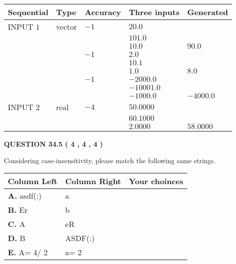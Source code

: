 \documentclass[12pt]{article}
\begin{document}
   
  
  
\noindent\begin{tabular}{|l|l|l|l|l|}
\hline
 Sequential & Type & Accuracy & Three inputs & Generated \\ 
\hline
 
 
  INPUT $            1 $ & vector & $           -1  $ & $
20.0
  $ & \\
  & & & $
101.0
  $ & \\
  & & & $
10.0
$ & $ 90.0 $ 
  \\
  & & $           -1  $ & $
2.0
  $ & \\
  & & & $
10.1
  $ & \\
  & & & $
1.0
$ & $ 8.0 $ 
  \\
  & & $           -1  $ & $
-2000.0
  $ & \\
  & & & $
-10001.0
  $ & \\
  & & & $
-1000.0
$ & $ -4000.0 $ 
 \\  \hline  
 
 
  INPUT $            2 $ & real & $           -4  $ & $
 50.0000
  $ & \\
  & & &  $
 60.1000
  $ & \\
  & & &  $
 2.0000
 $ & $ 58.0000 $ 
 \\  \hline  
 \end{tabular}
   
   
  
\vspace{0.2in}
  
{\textbf{\Large{QUESTION
34.5 
 (           4 ,           4 ,           4 )
}}}
  
  
Considering case-insensitivity, please match the following same strings.
  
  
\begin{tabular}{|l|l|l|}
 \hline
 Column Left & Column Right  & Your choinces \\ 
 \hline
{\textbf{\large{
A.}}}
asdf(:)
  & 
a
 & 
 \\ 
 \hline
{\textbf{\large{
B.}}}
Er
  & 
b
 & 
 \\ 
 \hline
{\textbf{\large{
C.}}}
A
  & 
eR
 & 
 \\ 
 \hline
{\textbf{\large{
D.}}}
B
  & 
ASDF(:)
 & 
 \\ 
 \hline
{\textbf{\large{
E.}}}
 A= %
4/ %
2

  & 
 a= %
2
 & 
 \\ 
 \hline
 \end{tabular}
  
  
 
\end{document}
